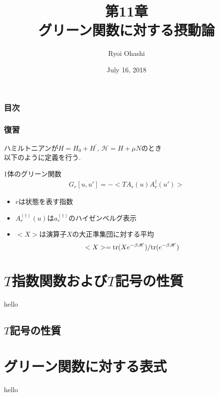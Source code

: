 \documentclass[dvipdfmx,11pt]{beamer}
\title{第11章\\グリーン関数に対する摂動論}
\author{Ryoi Ohashi}
\date{July 16, 2018}
\institute{Department of Applied Physics, Nagoya University}
\begin{document}
\begin{frame}[plain]
    \maketitle
\end{frame}

\begin{frame}\frametitle{目次}
    \setcounter{tocdepth}{1}
    \tableofcontents
\end{frame}

\begin{frame}\frametitle{復習}
    ハミルトニアンが$H=H_0+H^{'}$, $\mathscr{H}=H+\mu N$のとき\\
    以下のように定義を行う.
    \begin{block}{1体のグリーン関数}
        \begin{align}
            G_r[u,u'] = -<TA_r(u)A_r^{\dagger}(u')>
        \end{align}
    \end{block}
    \setcounter{equation}{2}
    \begin{itemize}
        \item $r$は状態を表す指数\\
        \item $A_r^{(\dagger)}(u)$は$a_r^{(\dagger)}$のハイゼンベルグ表示\\
        \item $<X>$は演算子$X$の大正準集団に対する平均\\
        \begin{align}
            <X>={\rm tr}(X e^{-\beta\mathscr{H}})/{\rm tr}(e^{-\beta\mathscr{H}})
        \end{align}
        
    \end{itemize}
\end{frame}

\section{$T$指数関数および$T$記号の性質}
\begin{frame}
    hello
\end{frame}
\subsection{$T$記号の性質}

\section{グリーン関数に対する表式}
\begin{frame}
    hello
\end{frame}
\end{document}
